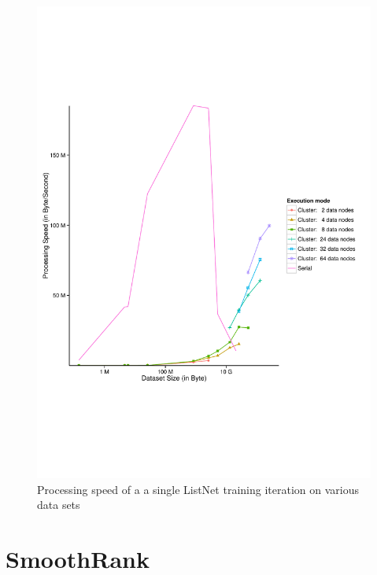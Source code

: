 \begin{figure}
\centering
\includegraphics[trim=0cm 5cm 0cm 5cm, scale=0.8]{gfx/processing_speed_single_logx.pdf}
\caption{Processing speed of a a single ListNet training iteration on various data sets}
\label{fig:listnet_processing_speed}
\end{figure}

\section{SmoothRank}